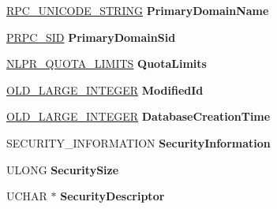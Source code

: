 \begin{DoxyCompactItemize}
\hyperlink{struct___r_p_c___u_n_i_c_o_d_e___s_t_r_i_n_g}{R\+P\+C\+\_\+\+U\+N\+I\+C\+O\+D\+E\+\_\+\+S\+T\+R\+I\+NG} {\bfseries Primary\+Domain\+Name}
\item 
\mbox{\label{struct___n_e_t_l_o_g_o_n___d_e_l_t_a___p_o_l_i_c_y_a1ce389412b356901fe572b4dbe4f1cd7}} 
\hyperlink{struct___r_p_c___s_i_d}{P\+R\+P\+C\+\_\+\+S\+ID} {\bfseries Primary\+Domain\+Sid}
\item 
\mbox{\label{struct___n_e_t_l_o_g_o_n___d_e_l_t_a___p_o_l_i_c_y_ac66705418ac01937cbe2cfae0af2a118}} 
\hyperlink{struct___n_l_p_r___q_u_o_t_a___l_i_m_i_t_s}{N\+L\+P\+R\+\_\+\+Q\+U\+O\+T\+A\+\_\+\+L\+I\+M\+I\+TS} {\bfseries Quota\+Limits}
\item 
\mbox{\label{struct___n_e_t_l_o_g_o_n___d_e_l_t_a___p_o_l_i_c_y_add96eed583a6482df9d2d1e887df0d9f}} 
\hyperlink{struct___o_l_d___l_a_r_g_e___i_n_t_e_g_e_r}{O\+L\+D\+\_\+\+L\+A\+R\+G\+E\+\_\+\+I\+N\+T\+E\+G\+ER} {\bfseries Modified\+Id}
\item 
\mbox{\label{struct___n_e_t_l_o_g_o_n___d_e_l_t_a___p_o_l_i_c_y_a636dc64eaa901f07319718ccdd7ce6b1}} 
\hyperlink{struct___o_l_d___l_a_r_g_e___i_n_t_e_g_e_r}{O\+L\+D\+\_\+\+L\+A\+R\+G\+E\+\_\+\+I\+N\+T\+E\+G\+ER} {\bfseries Database\+Creation\+Time}
\item 
\mbox{\label{struct___n_e_t_l_o_g_o_n___d_e_l_t_a___p_o_l_i_c_y_a004169769a86dbca049d4cb967981da5}} 
S\+E\+C\+U\+R\+I\+T\+Y\+\_\+\+I\+N\+F\+O\+R\+M\+A\+T\+I\+ON {\bfseries Security\+Information}
\item 
\mbox{\label{struct___n_e_t_l_o_g_o_n___d_e_l_t_a___p_o_l_i_c_y_a07865c2dd88cd6558bf7b9df6b40e00b}} 
U\+L\+O\+NG {\bfseries Security\+Size}
\item 
\mbox{\label{struct___n_e_t_l_o_g_o_n___d_e_l_t_a___p_o_l_i_c_y_a0e5ba84d86ff63ae5354f2d623e2245b}} 
U\+C\+H\+AR $\ast$ {\bfseries Security\+Descriptor}
\item 

\end{DoxyCompactItemize}
